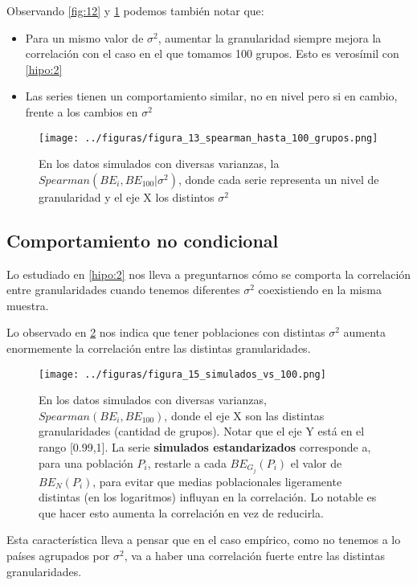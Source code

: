 Observando \ref{fig:12}  y \ref{fig:13} podemos también notar que:

\begin{itemize}
    \item Para un mismo valor de $\sigma^2$, aumentar la granularidad siempre mejora la correlación con el caso en el que tomamos 100 grupos. Esto es verosímil con \ref{hipo:2}
    \item Las series tienen un comportamiento similar, no en nivel pero si en cambio, frente a los cambios en $\sigma^2$
\end{itemize}

\begin{figure}[H]
    \centering 
    \texttt{[image: ../figuras/figura\_13\_spearman\_hasta\_100\_grupos.png]} 
    \caption{En los datos simulados con diversas varianzas, la $Spearman(BE_i,BE_{100} | \sigma^2)$, donde cada serie representa un nivel de granularidad y el eje X los distintos $\sigma^2$}
    \label{fig:13}
\end{figure}



\subsection{Comportamiento no condicional}

Lo estudiado en \ref{hipo:2} nos lleva a preguntarnos cómo se comporta la correlación entre granularidades cuando tenemos diferentes $\sigma^2$ coexistiendo en la misma muestra.

Lo observado en \ref{fig:15} nos indica que tener poblaciones con distintas $\sigma^2$ aumenta enormemente la correlación entre las distintas granularidades.

\begin{figure}[H]
    \centering 
    \texttt{[image: ../figuras/figura\_15\_simulados\_vs\_100.png]} 
    \caption{En los datos simulados con diversas varianzas, $Spearman(BE_i,BE_{100})$, donde el eje X son las distintas granularidades (cantidad de grupos). Notar que el eje Y está en el rango [0.99,1]. La serie \textbf{simulados estandarizados} corresponde a, para una población $P_i$, restarle a cada $BE_{G_j}(P_i)$ el valor de $BE_N(P_i)$, para evitar que medias poblacionales ligeramente distintas (en los logaritmos) influyan en la correlación. Lo notable es que hacer esto aumenta la correlación en vez de reducirla.}
    \label{fig:15}
\end{figure}

Esta característica lleva a pensar que en el caso empírico, como no tenemos a lo países agrupados por $\sigma^2$, va a haber una correlación fuerte entre las distintas granularidades. 
